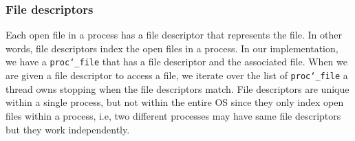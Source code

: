 \documentclass{article}
\renewcommand{\_}{\char`_}
\begin{document}
\subsubsection{File descriptors}
Each open file in a process has a file descriptor that represents the file. In other words, file descriptors index the open files in a process. In our implementation, we have a \texttt{proc\_file} that has a file descriptor and the associated file. When we are given a file descriptor to access a file, we iterate over the list of \texttt{proc\_file} a thread owns stopping when the file descriptors match.
File descriptors are unique within a single process, but not within the entire OS since they only index open files within a process, i.e, two different processes may have same file descriptors but they work independently.






\end{document}
